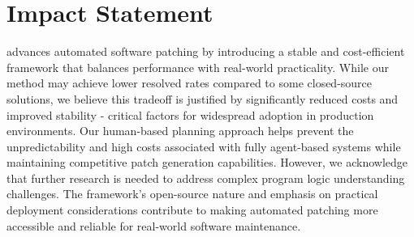 \section*{Impact Statement}
\sys advances automated software patching by introducing a stable and cost-efficient framework that balances performance with real-world practicality. While our method may achieve lower resolved rates compared to some closed-source solutions, we believe this tradeoff is justified by significantly reduced costs and improved stability - critical factors for widespread adoption in production environments. Our human-based planning approach helps prevent the unpredictability and high costs associated with fully agent-based systems while maintaining competitive patch generation capabilities. However, we acknowledge that further research is needed to address complex program logic understanding challenges. The framework's open-source nature and emphasis on practical deployment considerations contribute to making automated patching more accessible and reliable for real-world software maintenance.